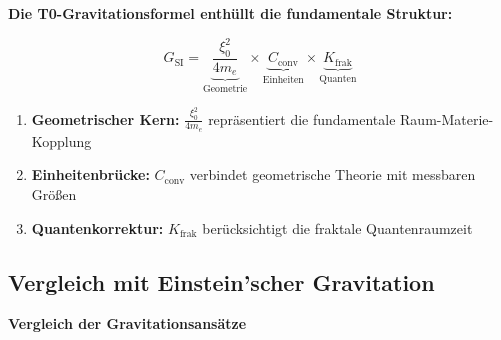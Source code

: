 	\begin{keyresult}
		\textbf{Die T0-Gravitationsformel enthüllt die fundamentale Struktur:}
		
		\begin{equation}
			G_{\text{SI}} = \underbrace{\frac{\xi_0^2}{4 m_e}}_{\text{Geometrie}} \times \underbrace{C_{\text{conv}}}_{\text{Einheiten}} \times \underbrace{K_{\text{frak}}}_{\text{Quanten}}
		\end{equation}
		
		\begin{enumerate}
			\item \textbf{Geometrischer Kern:} $\frac{\xi_0^2}{4 m_e}$ repräsentiert die fundamentale Raum-Materie-Kopplung
			
			\item \textbf{Einheitenbrücke:} $C_{\text{conv}}$ verbindet geometrische Theorie mit messbaren Größen
			
			\item \textbf{Quantenkorrektur:} $K_{\text{frak}}$ berücksichtigt die fraktale Quantenraumzeit
		\end{enumerate}
	\end{keyresult}
	
	\subsection{Vergleich mit Einstein'scher Gravitation}
	
	\begin{center}
		\par\vspace{0.5em}
		\textbf{Vergleich der Gravitationsansätze}
	\end{center}
	
